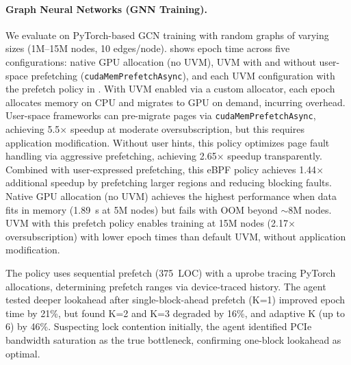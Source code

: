\paragraph{Graph Neural Networks (GNN Training).}
We evaluate \sys on PyTorch-based GCN training with random graphs of varying sizes (1M--15M nodes, 10 edges/node).
 shows epoch time across five configurations: native GPU allocation (no UVM), UVM with and without user-space prefetching (\texttt{cudaMemPrefetchAsync}), and each UVM configuration with the prefetch policy in \sys{}.
With UVM enabled via a custom allocator, each epoch allocates memory on CPU and migrates to GPU on demand, incurring overhead.
User-space frameworks can pre-migrate pages via \texttt{cudaMemPrefetchAsync}, achieving 5.5$\times$ speedup at moderate oversubscription, but this requires application modification.
Without user hints, this policy optimizes page fault handling via aggressive prefetching, achieving 2.65$\times$ speedup transparently.
Combined with user-expressed prefetching, this eBPF policy achieves 1.44$\times$ additional speedup by prefetching larger regions and reducing blocking faults.
Native GPU allocation (no UVM) achieves the highest performance when data fits in memory (1.89~s at 5M nodes) but fails with OOM beyond $\sim$8M nodes.
UVM with this prefetch policy enables training at 15M nodes (2.17$\times$ oversubscription) with lower epoch times than default UVM, without application modification.

The policy uses sequential prefetch (375~LOC) with a uprobe tracing PyTorch allocations, determining prefetch ranges via device-traced history.
The agent tested deeper lookahead after single-block-ahead prefetch (K=1) improved epoch time by 21\%, but found K=2 and K=3 degraded by 16\%, and adaptive K (up to 6) by 46\%.
Suspecting lock contention initially, the agent identified PCIe bandwidth saturation as the true bottleneck, confirming one-block lookahead as optimal.

